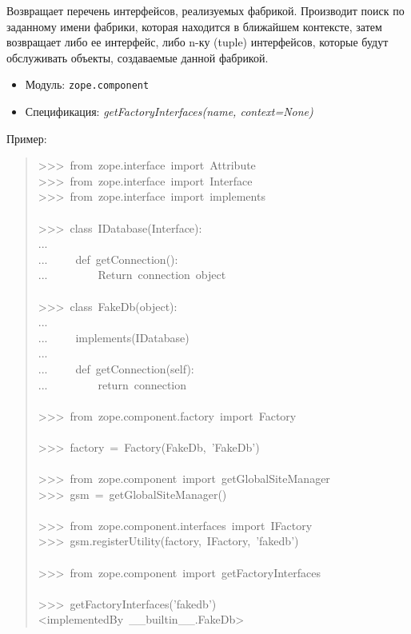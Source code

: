 \documentclass[14pt,a4paper,openany,twoside,final]{extbook}
\providecommand*{\DUroletitlereference}[1]{\textsl{#1}}
\begin{document}
Возвращает перечень интерфейсов, реализуемых фабрикой.  Производит
поиск по заданному имени фабрики, которая находится в ближайшем
контексте, затем возвращает либо ее интерфейс, либо n-ку (tuple)
интерфейсов, которые будут обслуживать объекты, создаваемые данной
фабрикой.

\begin{itemize}

\item Модуль: \texttt{zope.component}

\item Спецификация: \DUroletitlereference{getFactoryInterfaces(name, context=None)}

\end{itemize}

Пример:

\begin{quote}{\ttfamily \raggedright \noindent
>{}>{}>~from~zope.interface~import~Attribute\\
>{}>{}>~from~zope.interface~import~Interface\\
>{}>{}>~from~zope.interface~import~implements\\
~\\
>{}>{}>~class~IDatabase(Interface):\\
...\\
...~~~~~def~getConnection():\\
...~~~~~~~~~\textquotedbl{}\textquotedbl{}\textquotedbl{}Return~connection~object\textquotedbl{}\textquotedbl{}\textquotedbl{}\\
~\\
>{}>{}>~class~FakeDb(object):\\
...\\
...~~~~~implements(IDatabase)\\
...\\
...~~~~~def~getConnection(self):\\
...~~~~~~~~~return~\textquotedbl{}connection\textquotedbl{}\\
~\\
>{}>{}>~from~zope.component.factory~import~Factory\\
~\\
>{}>{}>~factory~=~Factory(FakeDb,~'FakeDb')\\
~\\
>{}>{}>~from~zope.component~import~getGlobalSiteManager\\
>{}>{}>~gsm~=~getGlobalSiteManager()\\
~\\
>{}>{}>~from~zope.component.interfaces~import~IFactory\\
>{}>{}>~gsm.registerUtility(factory,~IFactory,~'fakedb')\\
~\\
>{}>{}>~from~zope.component~import~getFactoryInterfaces\\
~\\
>{}>{}>~getFactoryInterfaces('fakedb')\\
<implementedBy~\_\_builtin\_\_.FakeDb>
}
\end{quote}
\end{document}
